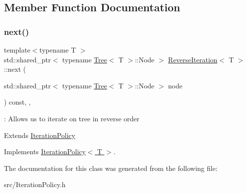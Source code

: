 \subsection{Member Function Documentation}
\mbox{\label{classReverseIteration_a3ca61dfcdf068fcc2905106a800c96fb}} 
\subsubsection{\texorpdfstring{next()}{next()}}
{\footnotesize\ttfamily template$<$typename T $>$ \\
std\+::shared\+\_\+ptr$<$ typename \hyperlink{classTree}{Tree}$<$ T $>$\+::Node $>$ \hyperlink{classReverseIteration}{Reverse\+Iteration}$<$ T $>$\+::next (\begin{DoxyParamCaption}\item[{std\+::shared\+\_\+ptr$<$ typename \hyperlink{classTree}{Tree}$<$ T $>$\+::Node $>$}]{node }\end{DoxyParamCaption}) const\hspace{0.3cm}{\ttfamily [override]}, {\ttfamily [virtual]}, {\ttfamily [noexcept]}}



\+: Allows us to iterate on tree in reverse order 

Extends \hyperlink{classIterationPolicy}{Iteration\+Policy} 

Implements \hyperlink{classIterationPolicy_a69a898482a3a2ec09fd6efec002bace8}{Iteration\+Policy$<$ T $>$}.



The documentation for this class was generated from the following file\+:\begin{DoxyCompactItemize}
\item 
src/Iteration\+Policy.\+h\end{DoxyCompactItemize}
